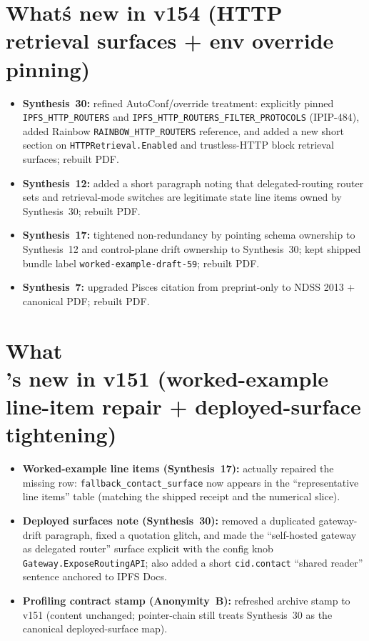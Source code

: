\documentclass[11pt]{article}
\begin{document}
\section{What\'s new in v154 (HTTP retrieval surfaces + env override pinning)}
\begin{itemize}[leftmargin=*]
\item \textbf{Synthesis~30:} refined AutoConf/override treatment: explicitly pinned \texttt{IPFS\_HTTP\_ROUTERS} and \texttt{IPFS\_HTTP\_ROUTERS\_FILTER\_PROTOCOLS} (IPIP-484), added Rainbow \texttt{RAINBOW\_HTTP\_ROUTERS} reference, and added a new short section on \texttt{HTTPRetrieval.Enabled} and trustless-HTTP block retrieval surfaces; rebuilt PDF.
\item \textbf{Synthesis~12:} added a short paragraph noting that delegated-routing router sets and retrieval-mode switches are legitimate state line items owned by Synthesis~30; rebuilt PDF.
\item \textbf{Synthesis~17:} tightened non-redundancy by pointing schema ownership to Synthesis~12 and control-plane drift ownership to Synthesis~30; kept shipped bundle label \texttt{worked-example-draft-59}; rebuilt PDF.
\item \textbf{Synthesis~7:} upgraded Pisces citation from preprint-only to NDSS 2013 + canonical PDF; rebuilt PDF.
\end{itemize}

\section{What\\'s new in v151 (worked-example line-item repair + deployed-surface tightening)}
\begin{itemize}[leftmargin=*]
\item \textbf{Worked-example line items (Synthesis~17):} actually repaired the missing row: \texttt{fallback\_contact\_surface} now appears in the ``representative line items'' table (matching the shipped receipt and the numerical slice).
\item \textbf{Deployed surfaces note (Synthesis~30):} removed a duplicated gateway-drift paragraph, fixed a quotation glitch, and made the ``self-hosted gateway as delegated router'' surface explicit with the config knob \texttt{Gateway.ExposeRoutingAPI}; also added a short \texttt{cid.contact} ``shared reader'' sentence anchored to IPFS Docs.
\item \textbf{Profiling contract stamp (Anonymity~B):} refreshed archive stamp to v151 (content unchanged; pointer-chain still treats Synthesis~30 as the canonical deployed-surface map).
\end{itemize}
\end{document}
